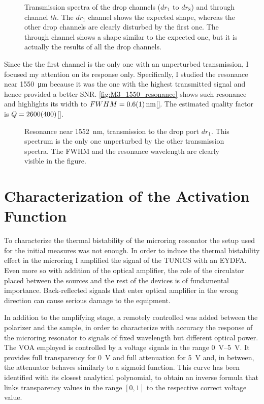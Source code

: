 \begin{figure}[htbp]
	\centering
%	
%	
	
	\caption{
		Transmission spectra of the drop channels ($dr_1$ to $dr_8$) and through channel $th$.
		The $dr_1$ channel shows the expected shape, whereas the other drop channels are clearly disturbed by the first one.
		The through channel shows a shape similar to the expected one, but it is actually the results of all the drop channels.
	}
	\label{fig:M3sweep}
\end{figure}

Since the the first channel is the only one with an unperturbed transmission, I focused my attention on its response only.
Specifically, I studied the resonance near \SI{1550}{\um} because it was the one with the highest transmitted signal and hence provided a better SNR.
\autoref{fig:M3_1550_resonance} shows such resonance and highlights its width to $FWHM=\SI{0.6+-0.1}{\nm}$\ref{}.
The estimated quality factor is $Q=\num{2600+-400}$\ref{}.

\begin{figure}[htbp]
	\centering
	
	\caption{
		Resonance near \SI{1552}{\nm}, transmission to the drop port $dr_1$.
		This spectrum is the only one unperturbed by the other transmission spectra.
		The FWHM and the resonance wavelength are clearly visible in the figure.
	}
	\label{fig:M3_1550_resonance}
\end{figure}

\section{Characterization of the Activation Function}
\label{sec:Characterization_of_the_Activation_Function}
To characterize the thermal bistability of the microring resonator the setup used for the initial measures was not enough.
In order to induce the thermal bistability effect in the microring I amplified the signal of the TUNICS with an \ac{EYDFA}.
Even more so with addition of the optical amplifier, the role of the circulator placed between the sources and the rest of the devices is of fundamental importance.
Back-reflected signals that enter optical amplifier in the wrong direction can cause serious damage to the equipment.

In addition to the amplifying stage, a remotely controlled  was added between the polarizer and the sample, in order to characterize with accuracy the response of the microring resonator to signals of fixed wavelength but different optical power.
The \ac{VOA} employed is controlled by a voltage signals in the range \SIrange{0}{5}{\V}.
It provides full transparency for \SI{0}{\V} and full attenuation for \SI{5}{\V} and, in between, the attenuator behaves similarly to a sigmoid function.
This curve has been identified with its closest analytical polynomial, to obtain an inverse formula that links transparency values in the range $[0,1]$ to the respective correct voltage value.

